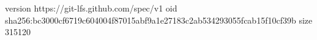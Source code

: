 version https://git-lfs.github.com/spec/v1
oid sha256:bc3000cf6719c604004f87015abf9a1e27183c2ab534293055fcab15f10cf39b
size 315120
